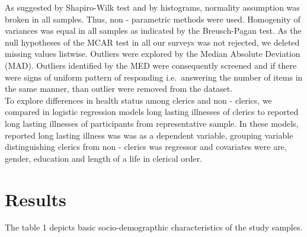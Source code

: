 \documentclass[ijerph,article,accept,moreauthors,pdftex]{mdpi}
\begin{document}
As suggested by Shapiro-Wilk test and by histograms, normality
assumption was broken in all samples. Thus, non - parametric methods
were used. Homogenity of variances was equal in all samples as indicated
by the Breusch-Pagan test. As the null hypotheses of the MCAR test in
all our surveys was not rejected, we deleted missing values listwise.
Outliers were explored by the Median Absolute Deviation (MAD). Outliers
identified by the MED were consequently screened and if there were signs
of uniform pattern of responding i.e.~answering the number of items in
the same manner, than outlier were removed from the dataset.\\
To explore differences in health status among clerics and non - clerics,
we compared in logistic regression models long lasting illnesses of
clerics to reported long lasting illnesses of participants from
representative sample. In these models, reported long lasting illness
was was as a dependent variable, grouping variable distinguishing
clerics from non - clerics was regressor and covariates were are,
gender, education and length of a life in clerical order.

\hypertarget{results}{%
\section{Results}\label{results}}

The table 1 depicts basic socio-demograpthic characteristics of the
study samples.

\newpage
\end{document}
